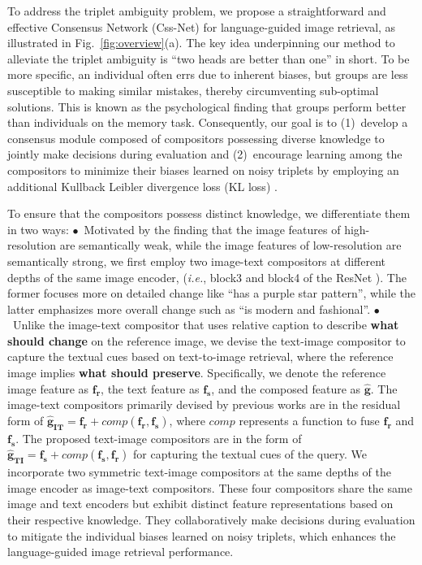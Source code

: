 \documentclass[sigconf]{acmart}
\def\ie{\emph{i.e.}}
\begin{document}
To address the triplet ambiguity problem, we propose a straightforward and effective Consensus Network (Css-Net) for language-guided image retrieval, as illustrated in Fig.~\!\ref{fig:overview}(a). 
The key idea underpinning our method to alleviate the triplet ambiguity is ``two heads are better than one'' in short. To be more specific, an individual often errs due to inherent biases, but groups are less susceptible to making similar mistakes, thereby circumventing sub-optimal solutions. This is known as the psychological finding \cite{hinsz1990cognitive} that groups perform better than individuals on the memory task. Consequently, our goal is to (1)~\!develop a consensus module composed of compositors possessing diverse knowledge to jointly make decisions during evaluation and (2)~\!encourage learning among the compositors to minimize their biases learned on noisy triplets by employing an additional Kullback Leibler divergence loss (KL loss) \cite{kullback1951information}. 

To ensure that the compositors possess distinct knowledge, we differentiate them in two ways: $\bullet$~Motivated by the finding \cite{lin2017feature,miech2021thinking} that the image features of high-resolution are semantically weak, while the image features of low-resolution are semantically strong, we first employ two image-text compositors at different depths of the same image encoder, (\ie, block3 and block4 of the ResNet \cite{he2016deep}). The former focuses more on detailed change like ``has a purple star pattern'', while the latter emphasizes more overall change such as ``is modern and fashional''. $\bullet$~Unlike the image-text compositor that uses relative caption to describe \textbf{what should change} on the reference image, we devise the text-image compositor to capture the textual cues based on text-to-image retrieval, where the reference image implies \textbf{what should preserve}. 
Specifically, we denote the reference image feature as $\bm{f_r}$, the text feature as $\bm{f_s}$, and the composed feature as $\bm{\hat{g}}$. The image-text compositors primarily devised by previous works \cite{vo2019composing,chen2020image,lee2021cosmo,wen2021comprehensive} are in the residual form of $\bm{\hat{g}_{IT}} = \bm{f_r} + comp(\bm{f_r},\bm{f_s})$, where $comp$ represents a function to fuse $\bm{f_r}$ and $\bm{f_s}$. The proposed text-image compositors are in the form of $\bm{\hat{g}_{TI}} = \bm{f_s} + comp(\bm{f_s},\bm{f_r})$ for capturing the textual cues of the query. We incorporate two symmetric text-image compositors at the same depths of the image encoder as image-text compositors. These four compositors share the same image and text encoders but exhibit distinct feature representations based on their respective knowledge. They collaboratively make decisions during evaluation to mitigate the individual biases learned on noisy triplets, which enhances the language-guided image retrieval performance.
\end{document}
